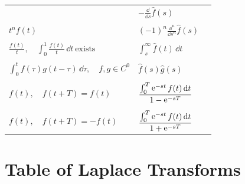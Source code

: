 \begin{longtable}{lll}
  & $\displaystyle -\frac{\dd}{\dd s} \hat{f}(s)$
  & \\
  \\
  $\displaystyle t^n f(t)$
  & $\displaystyle (-1)^n \frac{\dd^n}{\dd s^n} \hat{f}(s)$
  & \\
  \\
  $\displaystyle \frac{f(t)}{t}, 
  \quad \int_0^1 \frac{f(t)}{t}\,\dd t \ \mathrm{exists}$
  & $\displaystyle \int_s^\infty \hat{f}(t)\,\dd t$
  & \\
  \\
  $\displaystyle \int_0^t f(\tau)g(t - \tau)\,\dd \tau, 
  \quad f,g \in C^0$
  & $\displaystyle \hat{f}(s) \hat{g}(s)$
  & \\
  \\
  $\displaystyle f(t), \quad f(t + T) = f(t)$
  & $\displaystyle \frac{\int_0^T \mathop{\mathrm{e}}\nolimits^{- s t} f(t)\,\mathrm{d} t}{1 - \mathop{\mathrm{e}}\nolimits^{- s T}}$
  & \\
  \\
  $\displaystyle f(t), \quad f(t + T) = - f(t)$
  & $\displaystyle \frac{\int_0^T \mathop{\mathrm{e}}\nolimits^{- s t} f(t)\,\mathrm{d} t}{1 + \mathop{\mathrm{e}}\nolimits^{- s T}}$
  & 
\end{longtable}







\pagebreak
\section{Table of Laplace Transforms}



